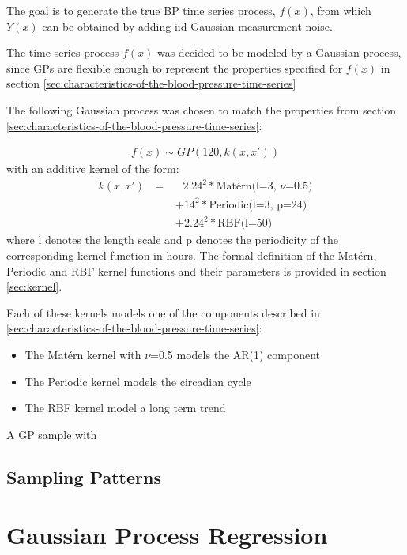 The goal is to generate the true BP time series process, $f(x)$, from which
$Y(x)$ can be obtained by adding iid Gaussian measurement noise.

The time series process $f(x)$ was decided to be modeled by a Gaussian process,
since GPs are flexible enough to represent the properties
specified for $f(x)$ in section \ref{sec:characteristics-of-the-blood-pressure-time-series}

The following Gaussian process was chosen to match the properties from
section \ref{sec:characteristics-of-the-blood-pressure-time-series}:

\begin{gather*}
    f(x) \sim GP(120, k(x,x'))
\end{gather*}
with an additive kernel of the form:
\begin{align*}
    k(x, x') \text{ } = &\text{ } 2.24^{2} * \text{Matérn(l=3, $\nu$=0.5)} \\
             &+  14^{2} * \text{Periodic(l=3, p=24)} \\
             &+  2.24^{2} * \text{RBF(l=50)}
\end{align*}
where l denotes the length scale and p denotes the periodicity
of the corresponding kernel function in hours.
The formal definition of the Matérn, Periodic and RBF kernel
functions and their parameters is provided in section \ref{sec:kernel}.

Each of these kernels models one of the components described in
\ref{sec:characteristics-of-the-blood-pressure-time-series}:
\begin{itemize}
    \item The Matérn kernel with $\nu$=0.5 models the AR(1) component
    \item The Periodic kernel models the circadian cycle
    \item The RBF kernel model a long term trend
\end{itemize}

A GP sample with


\subsection{Sampling Patterns}\label{subsec:sampling-patterns}


\section{Gaussian Process Regression}\label{sec:methods-gaussian-process-regression}


